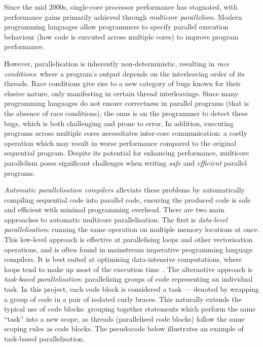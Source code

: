 \label{sec:1}

Since the mid 2000s, single-core processor performance has stagnated, with performance gains primarily achieved through \textit{multicore parallelism}. Modern programming languages allow programmers to specify parallel execution behaviour (how code is executed across multiple cores) to improve program performance.

However, parallelisation is inherently non-deterministic, resulting in \textit{race conditions}: where a program's output depends on the interleaving order of its threads. Race conditions give rise to a new category of bugs known for their elusive nature, only manifesting in certain thread interleavings. Since many programming languages do not ensure correctness in parallel programs (that is the absence of race conditions), the onus is on the programmer to detect these bugs, which is both challenging and prone to error. In addition, executing programs across multiple cores necessitates inter-core communication: a costly operation which may result in worse performance compared to the original sequential program. Despite its potential for enhancing performance, multicore parallelism poses significant challenges when writing \textit{safe} and \textit{efficient} parallel programs. 

\textit{Automatic parallelisation compilers} alleviate these problems by automatically compiling sequential code into parallel code, ensuring the produced code is safe and efficient with minimal programming overhead. There are two main approaches to automatic multicore parallelisation. The first is \textit{data-level parallelisation}: running the same operation on multiple memory locations at once. This low-level approach is effective at parallelising loops and other vectorisation operations, and is often found in mainstream imperative programming language compilers. It is best suited at optimising data-intensive computations, where loops tend to make up most of the execution time~\cite{doi:10.1080/09720529.2021.1951435}. The alternative approach is \textit{task-based parallelisation}: parallelising groups of code representing an individual task. In this project, each code block is considered a task --- denoted by wrapping a group of code in a pair of isolated curly braces. This naturally extends the typical use of code blocks: grouping together statements which perform the same ``task'' into a new scope, as threads (parallelised code blocks) follow the same scoping rules as code blocks. The pseudocode below illustrates an example of task-based parallelisation.

